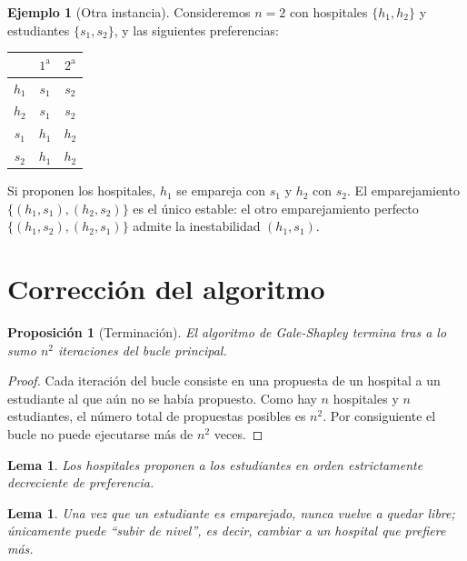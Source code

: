 \documentclass[12pt, spanish, oneside, openany]{book}
\theoremstyle{uprightplain}
\newtheorem{lema}[teorema]{Lema}
\newtheorem{proposicion}[teorema]{Proposición}
\theoremstyle{definition}
\newtheorem{ejemplo}[teorema]{Ejemplo}
\theoremstyle{remark}
\theoremstyle{definition}
\begin{document}
\begin{ejemplo}[Otra instancia]
\label{ej:n2}
Consideremos $n=2$ con hospitales $\{h_1,h_2\}$ y estudiantes $\{s_1,s_2\}$, y las siguientes preferencias:
\begin{center}
\begin{tabular}{c|cc}
\toprule
 & $1^\text{a}$ & $2^\text{a}$ \\
\midrule
$h_1$ & $s_1$ & $s_2$ \\
$h_2$ & $s_1$ & $s_2$ \\
\midrule
$s_1$ & $h_1$ & $h_2$ \\
$s_2$ & $h_1$ & $h_2$ \\
\bottomrule
\end{tabular}
\end{center}
Si proponen los hospitales, $h_1$ se empareja con $s_1$ y $h_2$ con $s_2$. El emparejamiento $\{(h_1,s_1),(h_2,s_2)\}$ es el único estable: el otro emparejamiento perfecto $\{(h_1,s_2),(h_2,s_1)\}$ admite la inestabilidad $(h_1,s_1)$.
\end{ejemplo}

\section{Corrección del algoritmo}

\begin{proposicion}[Terminación]
\label{prop:terminacion}
El algoritmo de Gale-Shapley termina tras a lo sumo $n^2$ iteraciones del bucle principal.
\end{proposicion}
\begin{proof}
Cada iteración del bucle consiste en una propuesta de un hospital a un estudiante al que aún no se había propuesto. Como hay $n$ hospitales y $n$ estudiantes, el número total de propuestas posibles es $n^2$. Por consiguiente el bucle no puede ejecutarse más de $n^2$ veces.
\end{proof}

\begin{lema}
\label{lema:propone-decreciente}
Los hospitales proponen a los estudiantes en orden estrictamente decreciente de preferencia.
\end{lema}

\begin{lema}
\label{lema:estudiante-sube}
Una vez que un estudiante es emparejado, nunca vuelve a quedar libre; únicamente puede ``subir de nivel'', es decir, cambiar a un hospital que prefiere más.
\end{lema}
\end{document}
